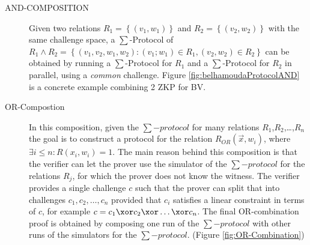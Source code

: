 \begin{description}
\item[AND-COMPOSITION] Given two relations $R_1 = \left\{ (v_1,w_1) \right\}$
  and $R_2 = \left\{ (v_2, w_2) \right\}$ with the same challenge space, a
  $\sum$-Protocol of
  $R_1 \wedge R_2 = \left\{ (v_1, v_2, w_1, w_2): (v_1;w_1) \in R_1, (v_2,w_2)
    \in R_2\right\}$ can be obtained by running a $\sum$-Protocol for $R_1$ and
  a $\sum$-Protocol for $R_2$ in parallel, using a \emph{common} challenge.
  Figure \ref{fig:belhamoudaProtocolAND} is a concrete example combining 2 ZKP for BV.
  

\item[OR-Compostion] In this composition, given the $\sum-protocol$ for many  
  relations $R_{1}$,$R_{2}$,\dots,\(R_{n}\) the goal is to construct a protocol for the
  relation
  $R_{OR}(\vec{x}, w_{i}) $, where \(\exists i \leq n: R(x_{i},w_{i}) = 1\). The main reason behind this composition is that the verifier
  can let the prover use the simulator of the \(\sum-protocol\) for the
  relations \(R_{j}\), for which the prover does not know the witness.
  The verifier provides a single challenge \(c\)
  such that the prover can split that into challenges \(c_{1}, c_{2}, \dots, c_{n}\)
  provided that \(c_{i}\) satisfies a linear constraint in terms of \(c\),
  for example \(c = c_{1} \xor c_{2} \xor \dots \xor c_{n}\). The final OR-combination proof is
  obtained by composing one run of the \(\sum-protocol\) with other runs of the
  simulators for the \(\sum-protocol\). (Figure \ref{fig:OR-Combination})


\end{description}
